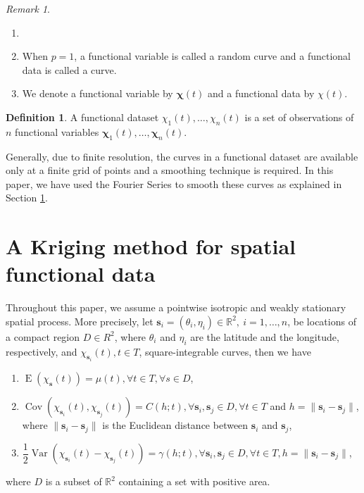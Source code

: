 \documentclass[12pt]{interact}
\theoremstyle{plain}%
\theoremstyle{definition}
\newtheorem{definition}[theorem]{Definition}
\theoremstyle{remark}
\newtheorem{remark}{Remark}
\DeclareMathOperator{\vari}{Var}
\DeclareMathOperator{\espe}{E}
\DeclareMathOperator{\cov}{Cov}
\begin{document}
\begin{remark}
	\begin{enumerate}
		\item[]
		\item When $p = 1$, a functional variable is called a random curve and a functional data is called a curve.
		\item We denote a functional variable by $\bm{\chi}(t)$ and a functional data by $\chi(t)$.
	\end{enumerate}
\end{remark}

\begin{definition}
	A functional dataset \(\chi_1(t), \dots, \chi_n(t)\) is a set of observations of \(n\) functional variables \(\bm{\chi}_1(t), \dots, \bm{\chi}_n(t)\).
\end{definition}

Generally, due to finite resolution, the curves in a functional dataset are available only at a finite grid of points and a smoothing technique is required.
In this paper, we have used the Fourier Series to smooth these curves as explained in Section \ref{sec:kriging}.

\section{A Kriging method for spatial functional data}\label{sec:kriging}

Throughout this paper, we assume a pointwise isotropic and weakly stationary spatial process. More precisely, let \(\bm{s}_i = (\theta_i, \eta_i) \in \mathbb{R}^2,\ i = 1, \dots, n\), be locations of a compact region \(D \in R^2\), where \(\theta_i\) and \(\eta_i\) are the latitude and the longitude, respectively, and \(\chi_{\bm{s}_i}(t), t \in T\), square-integrable curves, then we have
\begin{enumerate}
	\item $\espe (\chi_{\bm{s}}(t)) = \mu(t), \forall t \in T, \forall s \in D$,
	\item $\cov(\chi_{\bm{s}_i}(t), \chi_{\bm{s}_j}(t)) = C(h;t), \forall \bm{s}_i, \bm{s}_j \in D, \forall t \in T$ and 
	$h = \lVert\bm{s}_i -\bm{s}_j\rVert$, where $\lVert\bm{s}_i -\bm{s}_j\rVert$ is the Euclidean distance between $\bm{s}_i$ and $\bm{s}_j$,
	\item $\dfrac{1}{2}\vari(\chi_{\bm{s}_i}(t)-\chi_{\bm{s}_j}(t))= \gamma(h;t), \forall \bm{s}_i, \bm{s}_j \in D, \forall t \in T, h = \lVert\bm{s}_i-\bm{s}_j\rVert$,
\end{enumerate}
where \(D\) is a subset of \(\mathbb{R}^2\) containing a set with positive area.
\end{document}

